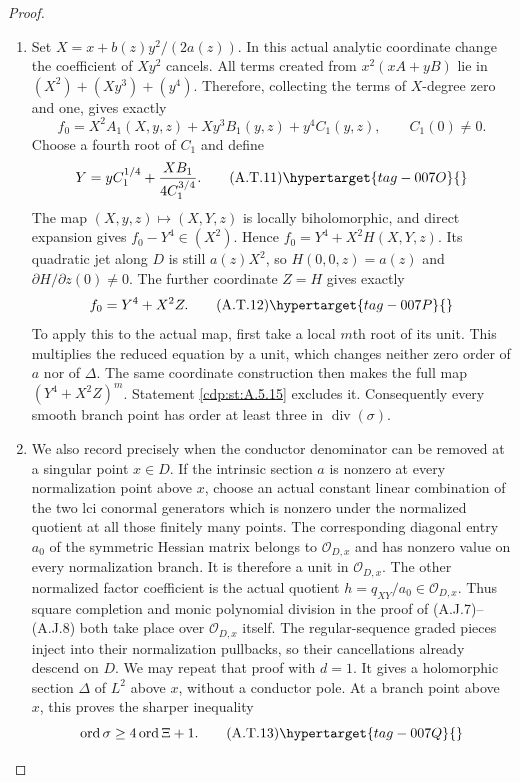 \begin{proof}
\begin{enumerate}[label={$\langle1\rangle$\arabic*.},leftmargin=*]
\item Set $X=x+b(z)y^2/(2a(z))$. In this actual analytic
coordinate change the coefficient of $Xy^2$ cancels.
All terms created from $x^2(xA+yB)$ lie in
$(X^2)+(Xy^3)+(y^4)$. Therefore, collecting the
terms of $X$-degree zero and one, gives exactly
\[
 f_0=X^2A_1(X,y,z)+Xy^3B_1(y,z)+y^4C_1(y,z),
 \qquad C_1(0)\ne0.
\]
Choose a fourth root of $C_1$ and define
\[
 Y=yC_1^{1/4}+
                  \frac{XB_1}{4C_1^{3/4}}.
                                                        \tag{A.T.11}\hypertarget{tag-007O}{}\label{cdp:eq:A.T.11}
\]
The map $(X,y,z)\mapsto(X,Y,z)$ is locally
biholomorphic, and direct expansion gives
$f_0-Y^4\in(X^2)$. Hence $f_0=Y^4+X^2H(X,Y,z)$.
Its quadratic jet along $D$ is still $a(z)X^2$,
so $H(0,0,z)=a(z)$ and $\partial H/\partial z(0)\ne0$.
The further coordinate $Z=H$ gives exactly
\[
                         f_0=Y^4+X^2Z.             \tag{A.T.12}\hypertarget{tag-007P}{}\label{cdp:eq:A.T.12}
\]
To apply this to the actual map, first take a local
$m$th root of its unit. This multiplies the reduced
equation by a unit, which changes neither zero order
of $a$ nor of $\Delta$. The same coordinate construction
then makes the full map $(Y^4+X^2Z)^m$.
Statement \ref{cdp:st:A.5.15} excludes it. Consequently every
smooth branch point has order at least three in
$\operatorname{div}(\sigma)$.

\item We also record precisely when the conductor denominator
can be removed at a singular point $x\in D$.
If the intrinsic section $a$ is nonzero at every
normalization point above $x$, choose an actual
constant linear combination of the two lci conormal
generators which is nonzero under the normalized
quotient at all those finitely many points. The
corresponding diagonal entry $a_0$ of the symmetric
Hessian matrix belongs to $\mathcal O_{D,x}$ and
has nonzero value on every normalization branch.
It is therefore a unit in $\mathcal O_{D,x}$.
The other normalized factor coefficient is the
actual quotient $h=q_{XY}/a_0\in\mathcal O_{D,x}$.
Thus square completion and monic polynomial division
in the proof of (A.J.7)--(A.J.8) both take place
over $\mathcal O_{D,x}$ itself. The regular-sequence
graded pieces inject into their normalization
pullbacks, so their cancellations already descend
on $D$. We may repeat that proof with $d=1$.
It gives a holomorphic section $\Delta$ of $L^2$
above $x$, without a conductor pole. At a branch
point above $x$, this proves the sharper inequality
\[
 \operatorname{ord}\sigma\ge
                        4\operatorname{ord}\Xi+1.
                                                        \tag{A.T.13}\hypertarget{tag-007Q}{}\label{cdp:eq:A.T.13}
\]


\end{enumerate}
\end{proof}
